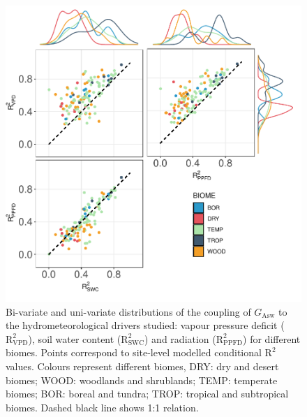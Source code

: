 \documentclass[11pt,twoside]{reedthesis}
\begin{document}
\begin{figure}[hbt!]

{\centering \includegraphics[width=1\linewidth]{figure/CH4/Figure1} 

}

\caption[Bi-variate and uni-variate distributions of the coupling of $G_{\text{Asw}}$ to the hydrometeorological drivers.]{Bi-variate and uni-variate distributions of the coupling of $G_{\text{Asw}}$ to the hydrometeorological drivers studied: vapour pressure deficit ($\text{R}^2_{\text{VPD}}$), soil water content ($\text{R}^2_{\text{SWC}}$) and radiation ($\text{R}^2_{\text{PPFD}}$) for different biomes. Points correspond to site-level modelled conditional $\text{R}^2$ values. Colours represent different biomes, DRY: dry and desert biomes; WOOD: woodlands and shrublands; TEMP: temperate biomes; BOR: boreal and tundra; TROP: tropical and subtropical biomes. Dashed black line shows 1:1 relation.}\label{fig:ch4fig1}
\end{figure}
\end{document}
